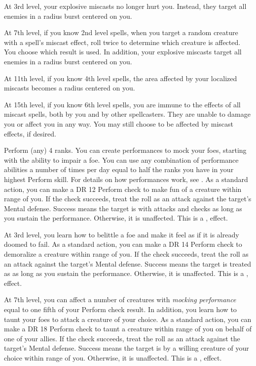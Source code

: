     At 3rd level, your explosive miscasts no longer hurt you.
    Instead, they target all enemies in a \areasmall radius burst centered on you.

    At 7th level, if you know 2nd level spells, when you target a random creature with a spell's miscast effect, roll twice to determine which creature is affected.
    You choose which result is used.
    In addition, your explosive miscasts target all enemies in a \areamed radius burst centered on you.

    At 11th level, if you know 4th level spells, the area affected by your localized miscasts becomes a \areamed radius centered on you.

    At 15th level, if you know 6th level spells, you are immune to the effects of all miscast spells, both by you and by other spellcasters.
    They are unable to damage you or affect you in any way.
    You may still choose to be affected by miscast effects, if desired.

    \featpre Perform (any) 4 ranks.
    \featben You can create performances to mock your foes, starting with the ability to impair a foe.
    You can use any combination of performance abilities a number of times per day equal to half the ranks you have in your highest Perform skill.
    For details on how performances work, see .
     As a standard action, you can make a DR 12 Perform check to make fun of a creature within \rngmed range of you.
    If the check succeeds, treat the roll as an attack against the target's Mental defense.
    Success means the target is \impaired with attacks and checks as long as you sustain the performance.
    Otherwise, it is unaffected.
    This is a ,  effect.

    At 3rd level, you learn how to belittle a foe and make it feel as if it is already doomed to fail.
     As a standard action, you can make a DR 14 Perform check to demoralize a creature within \rngmed range of you.
    If the check succeeds, treat the roll as an attack against the target's Mental defense.
    Success means the target is treated as \bloodied as long as you sustain the performance.
    Otherwise, it is unaffected.
    This is a ,  effect.

    At 7th level, you can affect a number of creatures with \textit{mocking performance} equal to one fifth of your Perform check result.
    In addition, you learn how to taunt your foes to attack a creature of your choice.
     As a standard action, you can make a DR 18 Perform check to taunt a creature within \rngmed range of you on behalf of one of your allies.
    If the check succeeds, treat the roll as an attack against the target's Mental defense.
    Success means the target is \taunted by a willing creature of your choice within \rngmed range of you.
    Otherwise, it is unaffected.
    This is a ,  effect.

